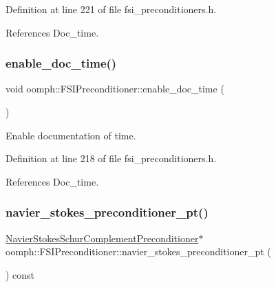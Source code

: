 Definition at line 221 of file fsi\+\_\+preconditioners.\+h.



References Doc\+\_\+time.

\mbox{\label{classoomph_1_1FSIPreconditioner_a2836b05d6eb81b807bd53b50dad7d3a0}} 
\subsubsection{\texorpdfstring{enable\+\_\+doc\+\_\+time()}{enable\_doc\_time()}}
{\footnotesize\ttfamily void oomph\+::\+F\+S\+I\+Preconditioner\+::enable\+\_\+doc\+\_\+time (\begin{DoxyParamCaption}{ }\end{DoxyParamCaption})\hspace{0.3cm}{\ttfamily [inline]}}



Enable documentation of time. 



Definition at line 218 of file fsi\+\_\+preconditioners.\+h.



References Doc\+\_\+time.

\mbox{\label{classoomph_1_1FSIPreconditioner_a8cd1be6bffd5014090350064177c0283}} 
\subsubsection{\texorpdfstring{navier\+\_\+stokes\+\_\+preconditioner\+\_\+pt()}{navier\_stokes\_preconditioner\_pt()}}
{\footnotesize\ttfamily \hyperlink{classoomph_1_1NavierStokesSchurComplementPreconditioner}{Navier\+Stokes\+Schur\+Complement\+Preconditioner}$\ast$ oomph\+::\+F\+S\+I\+Preconditioner\+::navier\+\_\+stokes\+\_\+preconditioner\+\_\+pt (\begin{DoxyParamCaption}{ }\end{DoxyParamCaption}) const\hspace{0.3cm}{\ttfamily [inline]}}



